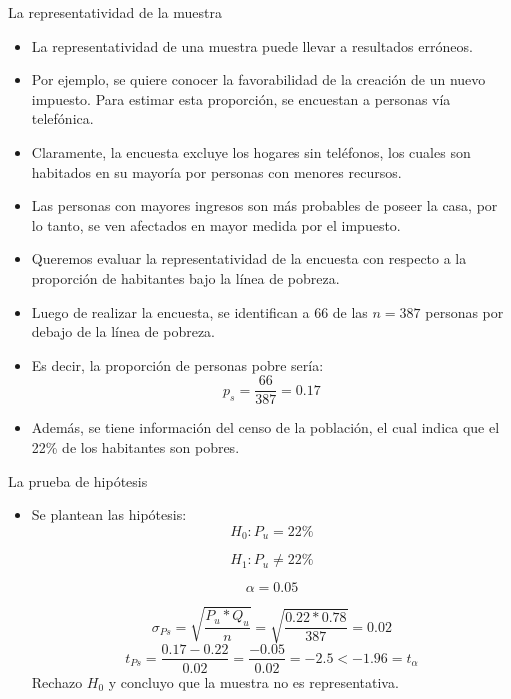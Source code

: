 \documentclass{beamer}
\begin{document}
\begin{frame}{La representatividad de la muestra}
\begin{itemize}
\justifying
\item La representatividad de una muestra puede llevar a resultados erróneos.
\item Por ejemplo, se quiere conocer la favorabilidad de la creación de un nuevo impuesto. Para estimar esta proporción, se encuestan a personas vía telefónica.
\item Claramente, la encuesta excluye los hogares sin teléfonos, los cuales son habitados en su mayoría por personas con menores recursos.
\item Las personas con mayores ingresos son más probables de poseer la casa, por lo tanto, se ven afectados en mayor medida por el impuesto.
\end{itemize}
\end{frame}

\begin{frame}
\begin{itemize}
\justifying
\item Queremos evaluar la representatividad de la encuesta con respecto a la proporción de habitantes bajo la línea de pobreza.
\item Luego de realizar la encuesta, se identifican a 66 de las $n=387$ personas por debajo de la línea de pobreza.
\item Es decir, la proporción de personas pobre sería:
$$p_s=\dfrac{66}{387}=0.17$$
\item Además, se tiene información del censo de la población, el cual indica que el 22\% de los habitantes son pobres.
\end{itemize}
\end{frame}

\begin{frame}{La prueba de hipótesis}
\begin{itemize}
\justifying
\item Se plantean las hipótesis:
$$H_0:P_u=22\%$$

$$H_1:P_u\neq22\%$$

$$\alpha=0.05$$

$$\sigma_{Ps}=\sqrt{\dfrac{P_{u}*Q_{u}}{n}}=\sqrt{\dfrac{0.22*0.78}{387}}=0.02$$
$$t_{Ps}=\dfrac{0.17-0.22}{0.02}=\dfrac{-0.05}{0.02}=-2.5<-1.96=t_{\alpha}$$
Rechazo $H_0$ y concluyo que la muestra no es representativa.
\end{itemize}
\end{frame}
\end{document}
